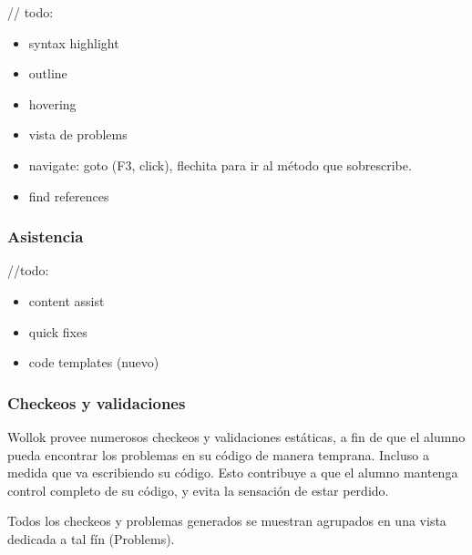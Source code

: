 // todo: 
\begin{itemize}
  \item syntax highlight
  \item outline
  \item hovering
  \item vista de problems 
  \item navigate: goto (F3, click), flechita para ir al método que sobrescribe.
  \item find references 
\end{itemize}

\subsubsection{Asistencia}

//todo: 
\begin{itemize}
  \item content assist
  \item quick fixes
  \item code templates (nuevo)
\end{itemize}

\subsubsection{Checkeos y validaciones}

Wollok provee numerosos checkeos y validaciones estáticas, a fin de que el
alumno pueda encontrar los problemas en su código de manera temprana.
Incluso a medida que va escribiendo su código.
Esto contribuye a que el alumno mantenga control completo de su
código, y evita la sensación de estar perdido.
 
Todos los checkeos y problemas
generados se muestran agrupados en una vista dedicada a tal fín (Problems).

